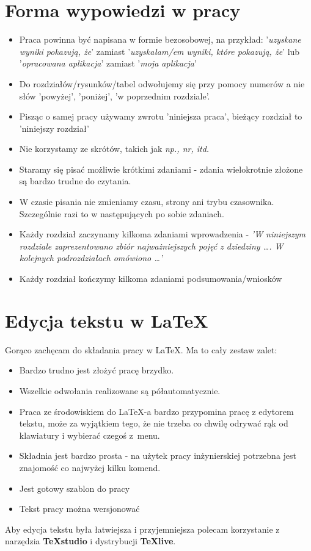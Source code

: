\section{Forma wypowiedzi w pracy}
\begin{itemize}
\item Praca powinna być napisana w formie bezosobowej, na przykład: '\textit{uzyskane wyniki pokazują, że}' zamiast '\textit{uzyskałam/em wyniki, które pokazują, że}' lub '\textit{opracowana aplikacja}' zamiast '\textit{moja aplikacja}' 
\item Do rozdziałów/rysunków/tabel odwołujemy się przy pomocy numerów a nie słów 'powyżej', 'poniżej', 'w poprzednim rozdziale'.
\item Pisząc o samej pracy używamy zwrotu 'niniejsza praca', bieżący rozdział to 'niniejszy rozdział'
\item Nie korzystamy ze skrótów, takich jak \emph{np., nr, itd.}
\item Staramy się pisać możliwie krótkimi zdaniami - zdania wielokrotnie złożone są bardzo trudne do czytania.
\item W czasie pisania nie zmieniamy czasu, strony ani trybu czasownika. Szczególnie razi to w następujących po sobie zdaniach.
\item Każdy rozdział zaczynamy kilkoma zdaniami wprowadzenia - \emph{'W niniejszym rozdziale zaprezentowano zbiór najważniejszych pojęć z dziedziny \dots. W kolejnych podrozdziałach omówiono \dots'}
\item Każdy rozdział kończymy kilkoma zdaniami podsumowania/wniosków
\end{itemize}

\section{Edycja tekstu w \LaTeX}
Gorąco zachęcam do składania pracy w \LaTeX. Ma to cały zestaw zalet:
\begin{itemize}
\item Bardzo trudno jest złożyć pracę brzydko.
\item Wszelkie odwołania realizowane są półautomatycznie.
\item Praca ze środowiskiem do \LaTeX-a bardzo przypomina pracę z edytorem tekstu, może za wyjątkiem tego, że nie trzeba co chwilę odrywać rąk od klawiatury i wybierać czegoś z~menu.
\item Składnia jest bardzo prosta - na użytek pracy inżynierskiej potrzebna jest znajomość co najwyżej kilku komend.
\item Jest gotowy szablon do pracy
\item Tekst pracy można wersjonować
\end{itemize}

Aby edycja tekstu była łatwiejsza i przyjemniejsza polecam korzystanie z narzędzia \textbf{TeXstudio} i dystrybucji \textbf{TeXlive}.